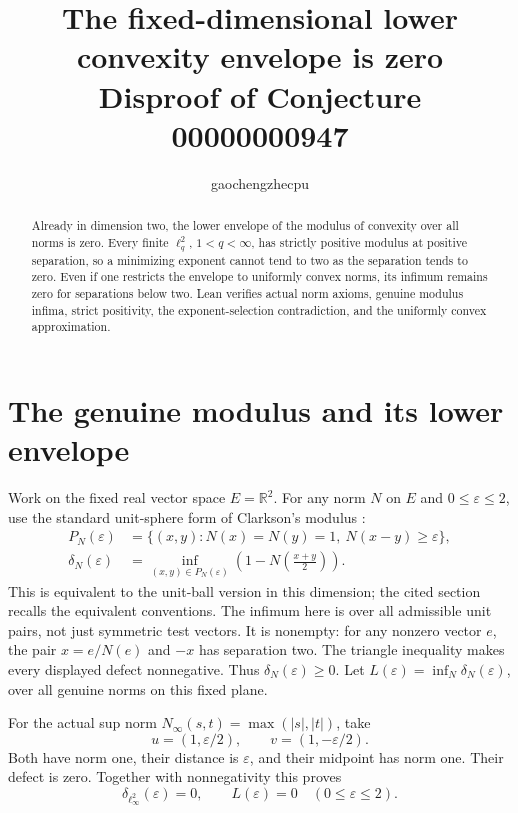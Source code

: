 \documentclass[11pt]{article}
\title{The fixed-dimensional lower convexity envelope is zero\\
\large Disproof of Conjecture 00000000947}
\author{gaochengzhecpu}\date{}
\begin{document}
\maketitle
\begin{abstract}
Already in dimension two, the lower envelope of the
modulus of convexity over all norms is zero. Every finite
$\ell_q^2$, $1<q<\infty$, has strictly positive modulus
at positive separation, so a minimizing exponent cannot
tend to two as the separation tends to zero. Even if one
restricts the envelope to uniformly convex norms, its
infimum remains zero for separations below two.
Lean verifies actual norm axioms, genuine modulus infima,
strict positivity, the exponent-selection contradiction,
and the uniformly convex approximation.
\end{abstract}

\section*{The genuine modulus and its lower envelope}
Work on the fixed real vector space $E=\mathbb R^2$.
For any norm $N$ on $E$ and $0\leq\varepsilon\leq2$, use
the standard unit-sphere form of Clarkson's modulus
\cite[Section 1]{llorens}:
\[
 \begin{split}
 P_N(\varepsilon)&=\{(x,y):N(x)=N(y)=1,\ N(x-y)\geq\varepsilon\},\\
 \delta_N(\varepsilon)&=
 \inf_{(x,y)\in P_N(\varepsilon)}
       \left(1-N\left(\frac{x+y}{2}\right)\right).
 \end{split}
\]
This is equivalent to the unit-ball version in this
dimension; the cited section recalls the equivalent
conventions. The infimum here is over all admissible
unit pairs, not just symmetric test vectors.
It is nonempty: for any nonzero vector $e$, the pair
$x=e/N(e)$ and $-x$ has separation two.
The triangle inequality makes every displayed defect
nonnegative. Thus $\delta_N(\varepsilon)\geq0$.
Let $L(\varepsilon)=\inf_N\delta_N(\varepsilon)$, over
all genuine norms on this fixed plane.

For the actual sup norm $N_\infty(s,t)=\max(|s|,|t|)$,
take
\[
 u=(1,\varepsilon/2),\qquad v=(1,-\varepsilon/2).
\]
Both have norm one, their distance is $\varepsilon$,
and their midpoint has norm one. Their defect is zero.
Together with nonnegativity this proves
\[
 \delta_{\ell_\infty^2}(\varepsilon)=0,
 \qquad L(\varepsilon)=0\quad(0\leq\varepsilon\leq2).
\]

\newpage
\end{document}
